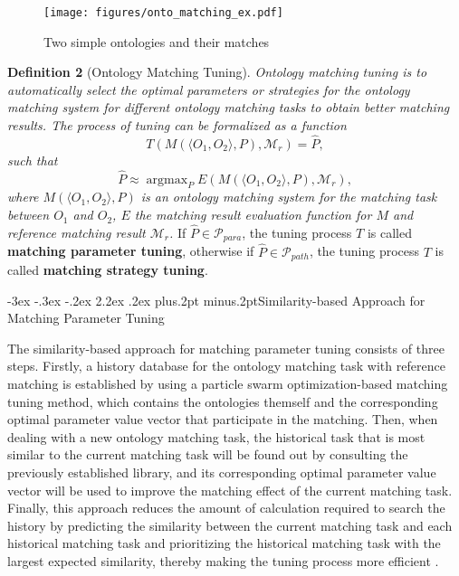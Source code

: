 \documentclass[twoside]{article}
\makeatletter
\def\section{\@startsection{section}{1}{\z@}%
 {-3ex \@plus -.3ex \@minus -.2ex}%
 {2.2ex \@plus.2ex}%
{\normalfont\normalsize\protect\baselineskip=14.5pt plus.2pt minus.2pt\bfseries}}
\makeatother
\begin{document}
\begin{figure}
	\centering
		\texttt{[image: figures/onto\_matching\_ex.pdf]}
	\caption{Two simple ontologies and their matches}
	\label{fig:onto_matching_ex}
\end{figure}



{\bf Definition 2} (Ontology Matching Tuning).
{\it
Ontology matching tuning is to automatically select the optimal parameters or strategies for the ontology matching system for different ontology matching tasks to obtain better matching results.
The process of tuning can be formalized as a function
$$T(M (\langle O_1, O_2\rangle , P), \mathcal {M}_r) = \hat{P},$$
such that
$$\hat{P} \approx \mathop{\arg\max}_{P} E (M (\langle O_1, O_2\rangle , P), \mathcal {M}_r),$$
where $M (\langle O_1, O_2\rangle , P) $ is an ontology matching system for the matching task between $ O_1$ and $ O_2 $,
$E$ the matching result evaluation function for $M$ and reference matching result $ \mathcal {M}_r $.
}
If $\hat{P} \in \mathcal{P}_{para} $, the tuning process $T$ is called {\bf matching parameter tuning},
otherwise if $\hat{P} \in \mathcal{P}_{path} $, the tuning process $T$ is called {\bf matching strategy tuning}.


\section{Similarity-based Approach for Matching Parameter Tuning}


The similarity-based approach for matching parameter tuning consists of three steps.
Firstly, a history database for the ontology matching task with reference matching is established by using a particle swarm optimization-based matching tuning method, which contains the ontologies themself and the corresponding optimal parameter value vector that participate in the matching.
Then, when dealing with a new ontology matching task, the historical task that is most similar to the current matching task will be found out by consulting the previously established library, and its corresponding optimal parameter value vector will be used to improve the matching effect of the current matching task.
Finally, this approach reduces the amount of calculation required to search the history by predicting the similarity between the current matching task and each historical matching task and prioritizing the historical matching task with the largest expected similarity, thereby making the tuning process more efficient .
\end{document}
